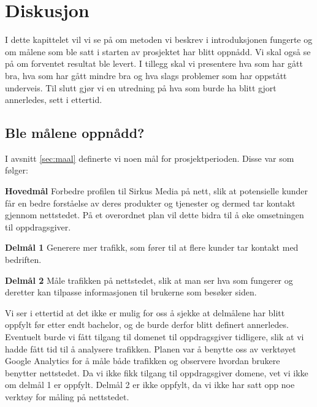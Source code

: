 \cleardoublepage
\chapter{Diskusjon}
\label{chap:discussion} 

I dette kapittelet vil vi se på om metoden vi beskrev i introduksjonen fungerte og om målene som ble satt i starten av prosjektet har blitt oppnådd. Vi skal også se på om forventet resultat ble levert. I tillegg skal vi presentere hva som har gått bra, hva som har gått mindre bra og hva slags problemer som har oppstått underveis. Til slutt gjør vi en utredning på hva som burde ha blitt gjort annerledes, sett i ettertid.

\section{Ble målene oppnådd?}
I avsnitt \ref{sec:maal} definerte vi noen mål for prosjektperioden. Disse var som følger:

\begin{compactitem}
    \item [{\bf Hovedmål}] Forbedre profilen til Sirkus Media på nett, slik at potensielle kunder får en bedre forståelse av deres produkter og tjenester og dermed tar kontakt gjennom nettstedet. På et overordnet plan vil dette bidra til å øke omsetningen til oppdragsgiver.
    \begin{compactitem}
        \item [{\bf  Delmål 1} ] Generere mer trafikk, som fører til at flere kunder tar kontakt med bedriften. 
        \item [{\bf  Delmål 2} ] Måle trafikken på nettstedet, slik at man ser hva som fungerer og deretter kan tilpasse informasjonen til brukerne som besøker siden.
    \end{compactitem}
\end{compactitem}

Vi ser i ettertid at det ikke er mulig for oss å sjekke at delmålene har blitt oppfylt før etter endt bachelor, og de burde derfor blitt definert annerledes. Eventuelt burde vi fått tilgang til domenet til oppdragsgiver tidligere, slik at vi hadde fått tid til å analysere trafikken. Planen var å benytte oss av verktøyet Google Analytics for å måle både trafikken og observere hvordan brukere benytter nettstedet. Da vi ikke fikk tilgang til oppdragsgiver domene, vet vi ikke om delmål 1 er oppfylt. Delmål 2 er ikke oppfylt, da vi ikke har satt opp noe verktøy for måling på nettstedet.

